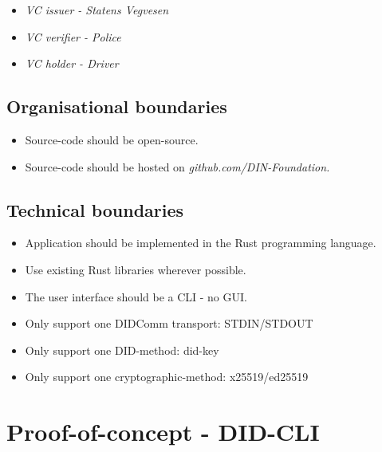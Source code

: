 \begin{itemize}
\tightlist
\item
  \emph{VC issuer - Statens Vegvesen}
\item
  \emph{VC verifier - Police}
\item
  \emph{VC holder - Driver}
\end{itemize}

\hypertarget{organisational-boundaries}{%
\subsection{Organisational boundaries}\label{organisational-boundaries}}

\begin{itemize}
\tightlist
\item
  Source-code should be open-source.
\item
  Source-code should be hosted on \emph{github.com/DIN-Foundation.}
\end{itemize}

\hypertarget{technical-boundaries}{%
\subsection{Technical boundaries}\label{technical-boundaries}}

\begin{itemize}
\tightlist
\item
  Application should be implemented in the Rust programming language.
\item
  Use existing Rust libraries wherever possible.
\item
  The user interface should be a CLI - no GUI.
\item
  Only support one DIDComm transport: STDIN/STDOUT
\item
  Only support one DID-method: did-key
\item
  Only support one cryptographic-method: x25519/ed25519
\end{itemize}



\pagebreak



\hypertarget{proof-of-concept---did-cli}{%
\section{Proof-of-concept - DID-CLI}\label{proof-of-concept---did-cli}}

